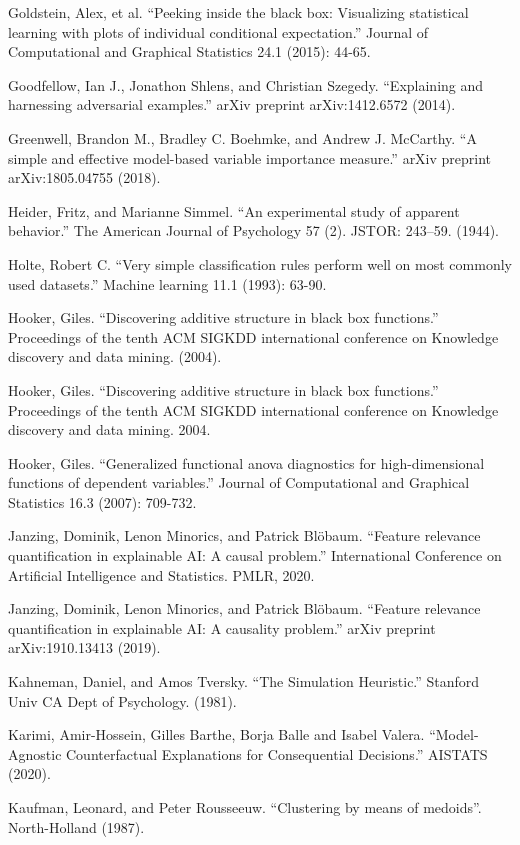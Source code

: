 \documentclass[12pt,]{krantz}
\begin{document}
Goldstein, Alex, et al. ``Peeking inside the black box: Visualizing
statistical learning with plots of individual conditional expectation.''
Journal of Computational and Graphical Statistics 24.1 (2015): 44-65.

Goodfellow, Ian J., Jonathon Shlens, and Christian Szegedy. ``Explaining
and harnessing adversarial examples.'' arXiv preprint arXiv:1412.6572
(2014).

Greenwell, Brandon M., Bradley C. Boehmke, and Andrew J. McCarthy. ``A
simple and effective model-based variable importance measure.'' arXiv
preprint arXiv:1805.04755 (2018).

Heider, Fritz, and Marianne Simmel. ``An experimental study of apparent
behavior.'' The American Journal of Psychology 57 (2). JSTOR: 243--59.
(1944).

Holte, Robert C. ``Very simple classification rules perform well on most
commonly used datasets.'' Machine learning 11.1 (1993): 63-90.

Hooker, Giles. ``Discovering additive structure in black box
functions.'' Proceedings of the tenth ACM SIGKDD international
conference on Knowledge discovery and data mining. (2004).

Hooker, Giles. ``Discovering additive structure in black box
functions.'' Proceedings of the tenth ACM SIGKDD international
conference on Knowledge discovery and data mining. 2004.

Hooker, Giles. ``Generalized functional anova diagnostics for
high-dimensional functions of dependent variables.'' Journal of
Computational and Graphical Statistics 16.3 (2007): 709-732.

Janzing, Dominik, Lenon Minorics, and Patrick Blöbaum. ``Feature
relevance quantification in explainable AI: A causal problem.''
International Conference on Artificial Intelligence and Statistics.
PMLR, 2020.

Janzing, Dominik, Lenon Minorics, and Patrick Blöbaum. ``Feature
relevance quantification in explainable AI: A causality problem.'' arXiv
preprint arXiv:1910.13413 (2019).

Kahneman, Daniel, and Amos Tversky. ``The Simulation Heuristic.''
Stanford Univ CA Dept of Psychology. (1981).

Karimi, Amir-Hossein, Gilles Barthe, Borja Balle and Isabel Valera.
``Model-Agnostic Counterfactual Explanations for Consequential
Decisions.'' AISTATS (2020).

Kaufman, Leonard, and Peter Rousseeuw. ``Clustering by means of
medoids''. North-Holland (1987).
\end{document}

